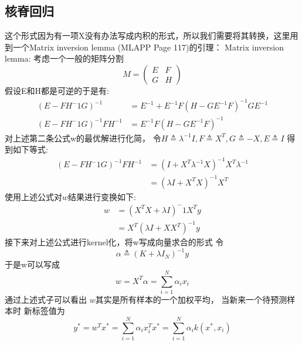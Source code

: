 \documentclass[UTF8]{ctexart}
\begin{document}
        \subsection{核脊回归}
        这个形式因为有一项X没有办法写成内积的形式，所以我们需要将其转换，这里用到一个Matrix inversion lemma (MLAPP Page 117)的引理：
        Matrix inversion lemma: 考虑一个一般的矩阵分割 
        \begin{equation}
        M = \left(
        \begin{array}{cc}
        E & F  \\
        G & H
        \end{array}
        \right)
        \end{equation}
        假设E和H都是可逆的于是有:
        \begin{equation}
        \begin{aligned}
        (E-FH^-1G)^{-1}&=E^{-1}+E^{-1}F(H-GE^{-1}F)^{-1}GE^{-1} \\
        (E-FH^-1G)^{-1}FH^{-1}&=E^{-1}F(H-GE^{-1}F)^{-1}
        \end{aligned}
        \end{equation}
        对上述第二条公式w的最优解进行化简， 令$H\triangleq \lambda^{-1}I, F\triangleq X^T, G\triangleq-X, E\triangleq I$ 得到如下等式:
        \begin{equation}
        \begin{aligned}
          (E-FH^-1G)^{-1}FH^{-1} & = (I+X^T\lambda^{-1}X)^{-1}X^T\lambda^{-1} \\
          & =(\lambda I+X^TX)^{-1}X^T
        \end{aligned}
        \end{equation}
        使用上述公式对$w$结果进行变换如下:
        \begin{equation}
        \begin{aligned}
          w & = (X^TX+\lambda I)^-1X^Ty \\
          & =X^T(\lambda I+XX^T)^{-1}y
        \end{aligned}
        \end{equation}
        接下来对上述公式进行kernel化，将w写成向量求合的形式 令
        \begin{equation}
        \alpha \triangleq (K+\lambda I_{N})^{-1}y
        \end{equation}
        于是w可以写成 
        \begin{equation}
        w = X^T\alpha = \sum_{i=1}^{N}{\alpha_i x_i}
        \end{equation}
        通过上述式子可以看出 $w$其实是所有样本的一个加权平均， 当新来一个待预测样本时 新标签值为
        \begin{equation}
        y^{*} = w^Tx^{*} = \sum_{i=1}^{N}{\alpha_i x_{i}^Tx^{*}} = \sum_{i=1}^{N}{\alpha_i k(x^{*}, x_i)}
        \end{equation}
\end{document}

